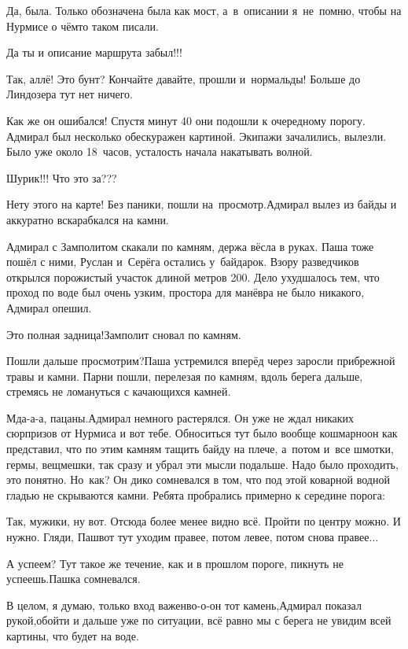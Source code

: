 \diagdash Да, была. Только обозначена была как мост, а~в~описании я~не~помню, чтобы на Нурмисе о чём\sdash то таком писали.

\diagdash Да ты и описание маршрута забыл!!!

\diagdash Так, аллё! Это бунт? Кончайте давайте, прошли и~нормальды! Больше до Линдозера тут нет ничего.

Как же он ошибался! Спустя минут 40 они подошли к очередному порогу. Адмирал был несколько обескуражен картиной. Экипажи зачалились, вылезли. Было уже около 18~часов, усталость начала накатывать волной.

\diagdash Шурик!!! Что это за???

\diagdash Нету этого на карте! Без паники, пошли на~просмотр.\mdash Адмирал вылез из байды и аккуратно вскарабкался на камни.

Адмирал с Замполитом скакали по камням, держа вёсла в руках. Паша тоже пошёл с ними, Руслан и~Серёга остались у~байдарок. Взору разведчиков открылся порожистый участок длиной метров 200. Дело ухудшалось тем, что проход по воде был очень узким, простора для манёвра не было никакого, Адмирал опешил.

\diagdash Это полная задница!\mdash Замполит сновал по камням.

\diagdash Пошли дальше просмотрим?\mdash Паша устремился вперёд через заросли прибрежной травы и камни. Парни пошли, перелезая по камням, вдоль берега дальше, стремясь не ломануться с качающихся камней.

\diagdash Мда-а-а, пацаны.\mdash Адмирал немного растерялся. Он уже не ждал никаких сюрпризов от Нурмиса и вот тебе. Обноситься тут было вообще кошмарно\mdash он как представил, что по этим камням тащить байду на плече, а~потом и~все шмотки, гермы, вещмешки, так сразу и убрал эти мысли подальше. Надо было проходить, это понятно. Но~как? Он дико сомневался в том, что под этой коварной водной гладью не скрываются камни. Ребята пробрались примерно к середине порога:

\diagdash Так, мужики, ну вот. Отсюда более менее видно всё. Пройти по центру можно. И нужно. Гляди, Паш\mdash вот тут уходим правее, потом левее, потом снова правее$\ldots$

\diagdash А успеем? Тут такое же течение, как и в прошлом пороге, пикнуть не успеешь.\mdash Пашка сомневался.

\diagdash В целом, я думаю, только вход важен\mdash во-о-он тот камень,\mdash Адмирал показал рукой,\mdash обойти и дальше уже по ситуации, всё равно мы с берега не увидим всей картины, что будет на воде.

